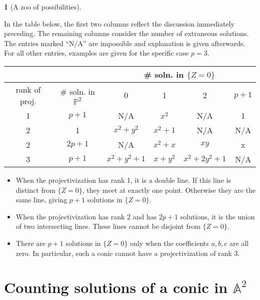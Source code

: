 \documentclass[10pt,a4paper]{amsart}
\numberwithin{equation}{section}
\numberwithin{figure}{section}
\theoremstyle{definition}
\newtheorem{example}{\protect\examplename}[section]
\theoremstyle{remark}
\theoremstyle{plain}
\theoremstyle{plain}
\theoremstyle{definition}
\theoremstyle{plain}
\theoremstyle{plain}
\providecommand{\examplename}{Example}
\newcommand{\A}{\mathbb{A}}
\begin{document}
    \begin{example}[A zoo of possibilities]
    \label{exa:all-possibilities}
    	
    In the table below, the first two columns reflect the discussion
    immediately preceding. The remaining columns consider the number of extraneous
    solutions. The entries marked ``N/A'' are impossible and explanation is given
    afterwards. For all other entries, examples are given for the specific case
    $p=3$.  
    \begin{center} %
        \begin{tabular}{|c|c||c|c|c|c|} \hline \multicolumn{2}{|c||}{} &
    \multicolumn{4}{c|}{\# soln. in $\{Z=0\}$}  \\ \hline rank of proj. & \# soln.
    in $\mathbb{P}^2$ & 0 & 1 & 2 & $p + 1$\\ \hline \hline 1 & $p+1$ & N/A & $x^2$
    & N/A & 1 \\ \hline 2 & 1 & $x^2 + y^2$ & $x^2 + 1$ & N/A & N/A \\ \hline 2 &
    $2p+1$ & N/A & $x^2 + x$ & $xy$ & x \\ \hline 3 & $p+1$ & $x^2 + y^2 + 1$ &
    $x+y^2$ & $x^2 + 2y^2 + 1$ & N/A \\ \hline \end{tabular}
    \end{center} 
    \begin{itemize}
        \item When the projectivization has rank 1, it is a double line. If this
        line is distinct from $\{Z = 0\}$, they meet at exactly one point. 
        Otherwise they are the same line, giving $p+1$ solutions in $\{Z=0\}$. 
        \item When the projectivization has rank 2 and has $2p + 1$ solutions, it
        is the union of two intersecting lines. These lines cannot be disjoint 
        from $\{Z=0\}$.
        \item There are $p+1$ solutions in $\{Z = 0\}$ only when the 
        coefficients $a,b,c$ are all zero. In particular, such a conic cannot 
        have a projectivization of rank 3.
    \end{itemize} 
    \end{example}

    \section{Counting solutions of a conic in $\A^2$}
    \label{sec:affine-solutions}
\end{document}
